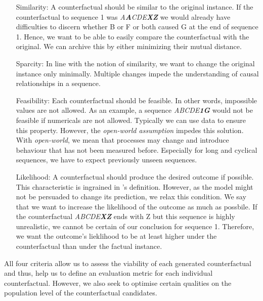\documentclass[./../../paper.tex]{subfiles}
\begin{document}
\begin{itemize}
    \item[Similarity:] A counterfactual should be similar to the original instance. If the counterfactual to sequence 1 was \textit{A\textbf{A}CDE\textbf{XZ}} we would already have difficulties to discern whether B or F or both caused G at the end of sequence 1. Hence, we want to be able to easily compare the counterfactual with the original. We can archive this by either minimizing their mutual distance.
    \item[Sparcity:] In line with the notion of similarity, we want to change the original instance only minimally. Multiple changes impede the understanding of causal relationships in a sequence. 
    \item[Feasibility:] Each counterfactual should be feasible. In other words, impossible values are not allowed. As an example, a sequence \textit{ABCDE\textbf{1G}} would not be feasible if numericals are not allowed. Typically we can use data to ensure this property. However, the \emph{open-world assumption} impedes this solution. With \emph{open-world}, we mean that processes may change and introduce behaviour that has not been measured before. Especially for long and cyclical sequences, we have to expect previously unseen sequences.  
    \item[Likelihood:] A counterfactual should produce the desired outcome if possible. This characteristic is ingrained in \citeauthor{molnar2019}'s definition. However, as the model might not be persuaded to change its prediction, we relax this condition. We say that we want to increase the likelihood of the outcome as much as possbile. If the counterfactual \textit{ABCDE\textbf{XZ}} ends with Z but this sequence is highly unrealistic, we cannot be certain of our conclusion for sequence 1. Therefore, we want the outcome's lieklihood to be at least higher under the counterfactual than under the factual instance. 
\end{itemize}

\noindent All four criteria allow us to assess the viability of each generated counterfactual and thus, help us to define an evaluation metric for each individual counterfactual. However, we also seek to optimise certain qualities on the population level of the counterfactual candidates.  
\end{document}
